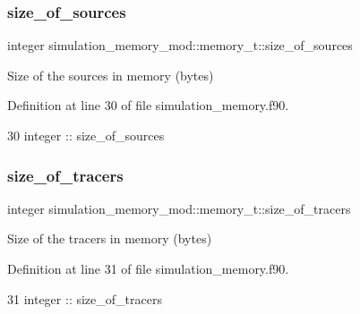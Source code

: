 \subsubsection{\texorpdfstring{size\+\_\+of\+\_\+sources}{size\_of\_sources}}
{\footnotesize\ttfamily integer simulation\+\_\+memory\+\_\+mod\+::memory\+\_\+t\+::size\+\_\+of\+\_\+sources\hspace{0.3cm}{\ttfamily [private]}}



Size of the sources in memory (bytes) 



Definition at line 30 of file simulation\+\_\+memory.\+f90.


\begin{DoxyCode}
30         \textcolor{keywordtype}{integer} :: size\_of\_sources
\end{DoxyCode}
\mbox{\label{structsimulation__memory__mod_1_1memory__t_a7b1960036177b6612be260699fcdb19a}} 
\subsubsection{\texorpdfstring{size\+\_\+of\+\_\+tracers}{size\_of\_tracers}}
{\footnotesize\ttfamily integer simulation\+\_\+memory\+\_\+mod\+::memory\+\_\+t\+::size\+\_\+of\+\_\+tracers\hspace{0.3cm}{\ttfamily [private]}}



Size of the tracers in memory (bytes) 



Definition at line 31 of file simulation\+\_\+memory.\+f90.


\begin{DoxyCode}
31         \textcolor{keywordtype}{integer} :: size\_of\_tracers
\end{DoxyCode}
\mbox{\label{structsimulation__memory__mod_1_1memory__t_ad5609fb1063d49593b5aa01c9be61241}} 
